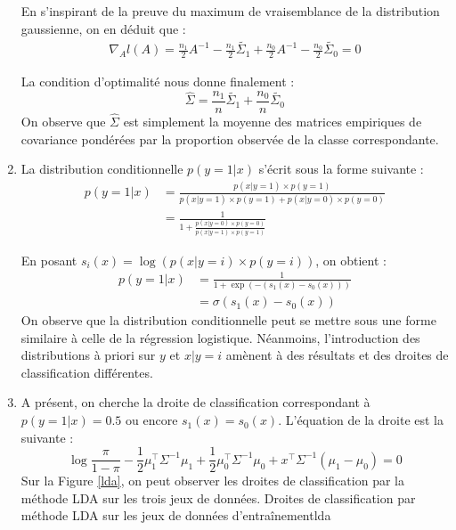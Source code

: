 \documentclass{article}
\begin{document}
\begin{enumerate}[label=(\alph*)]
En s'inspirant de la preuve du maximum de vraisemblance de la distribution gaussienne, on en déduit que :
\begin{align*}
\nabla_A l(A) = \frac{n_1}{2}A^{-1} - \frac{n_1}{2}\tilde{\Sigma_1} + \frac{n_0}{2}A^{-1} - \frac{n_0}{2}\tilde{\Sigma_0} = 0
\end{align*}

La condition d'optimalité nous donne finalement :
$$ \hat{\Sigma} = \frac{n_1}{n}\tilde{\Sigma_1} + \frac{n_0}{n}\tilde{\Sigma_0} $$
On observe que $\hat{\Sigma}$ est simplement la moyenne des matrices empiriques de covariance pondérées par la proportion observée de la classe correspondante.

\item La distribution conditionnelle $p(y=1|x)$ s'écrit sous la forme suivante :
\begin{align*}
p(y=1|x) &= \frac{p(x|y=1)\times p(y=1)}{p(x|y=1)\times p(y=1) + p(x|y=0)\times p(y=0)}\\
&= \frac{1}{1 + \frac{p(x|y=0)\times p(y=0)}{p(x|y=1)\times p(y=1)}}
\end{align*}

En posant $s_i(x) = \log(p(x|y=i)\times p(y=i))$, on obtient :
\begin{align*}
p(y=1|x) &= \frac{1}{1 + \exp(-(s_1(x)-s_0(x)))}\\
&= \sigma(s_1(x)-s_0(x))
\end{align*}
On observe que la distribution conditionnelle peut se mettre sous une forme similaire à celle de la régression logistique. Néanmoins, l'introduction des distributions à priori sur $y$ et $x|y=i$ amènent à des résultats et des droites de classification différentes.

\item A présent, on cherche la droite de classification correspondant à $p(y=1|x) = 0.5$ ou encore $s_1(x) = s_0(x)$. L'équation de la droite est la suivante :
$$
\log\frac{\pi}{1-\pi} - \frac{1}{2}\mu_1^\intercal \Sigma^{-1} \mu_1 + \frac{1}{2}\mu_0^\intercal \Sigma^{-1}\mu_0 + x^\intercal \Sigma^{-1}(\mu_1 - \mu_0) = 0
$$
Sur la Figure \ref{lda}, on peut observer les droites de classification par la méthode LDA sur les trois jeux de données.
          {}
          {}
          {Droites de classification par méthode LDA sur les jeux de données d'entraînement}{lda}
\end{enumerate}
\end{document}
